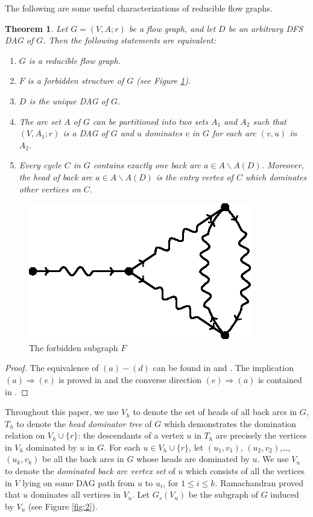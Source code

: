 \documentclass[11pt]{article}
\newtheorem{theorem}{Theorem}[section]
\begin{document}
The following are some useful characterizations of reducible flow graphs.
\begin{theorem}
\label{thm:1}
Let $G=(V,A;r)$ be a flow graph, and let $D$ be an arbitrary DFS DAG of $G$. Then the following statements are equivalent:
\begin{enumerate}[label=\emph{(}\alph*\emph{)}]
  \item $G$ is a reducible flow graph.
  \item $F$ is a forbidden structure of $G$ (see Figure \ref{fig:1}).
  \item $D$ is the unique DAG of $G$.
  \item The arc set $A$ of $G$ can be partitioned into two sets $A_1$ and $A_2$ such that $(V,A_1;r)$ is a DAG of $G$ and $u$ dominates $v$ in $G$ for each arc $(v,u)$ in $A_2$.
  \item Every cycle $C$ in $G$ contains exactly one back arc $a\in A\backslash A(D)$. Moreover, the head of back arc $a\in A\backslash A(D)$ is the entry vertex of $C$ which dominates other vertices on $C$.
\end{enumerate}
\end{theorem}

\begin{figure}
\centering
\includegraphics{FASPacking-fig1.eps}
\caption{The forbidden subgraph $F$}
\label{fig:1}
\end{figure}

\begin{proof}
The equivalence of $(a)-(d)$ can be found in \cite{HecU1} and \cite{HecU2}. The implication $(a)\Rightarrow (e)$ is proved in \cite{Sham} and the converse direction $(e)\Rightarrow (a)$ is contained in \cite{CheZ}.
\end{proof}

Throughout this paper, we use $V_h$ to denote the set of heads of all back arcs in $G$, $T_h$ to denote the \emph{head dominator tree} of $G$ which demonstrates the domination relation on $V_h\cup \{r\}$: the descendants of a vertex $u$ in $T_h$ are precisely the vertices in $V_h$ dominated by $u$ in $G$. For each $u\in V_h\cup\{r\}$, let $(u_1,v_1)$, $(u_2,v_2)$,\dots,$(u_k,v_k)$ be all the back arcs in $G$ whose heads are dominated by $u$. We use $V_u$ to denote the \emph{dominated back arc vertex set} of $u$ which consists of all the vertices in $V$ lying on some DAG path from $u$ to $u_i$, for $1\leq i\leq k$. Ramachandran \cite{Rama1,Rama2} proved that $u$ dominates all vertices in $V_u$. Let $G_s(V_u)$ be the subgraph of $G$ induced by $V_u$ (see Figure \ref{fig:2}).
\end{document}
